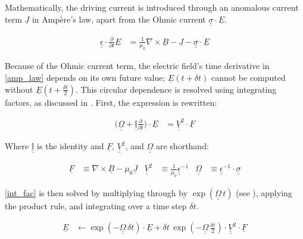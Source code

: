 \documentclass[draft,linenumbers]{agujournal}
\begin{document}

Mathematically, the driving current is introduced through an anomalous current term $\underline{J}$ in Amp\`ere's law, apart from the Ohmic current ${\underline{\underline{\sigma}} \cdot \underline{E}}$.

\begin{linenomath*}
\begin{align}
    \label{amp_law}
    \underline{\underline{\epsilon}} \cdot \frac{\partial}{\partial t} \underline{E} &= \frac{1}{\mu_0} \nabla \times \underline{B} - \underline{J}
      - \underline{\underline{\sigma}} \cdot \underline{E}
\end{align}
\end{linenomath*}

Because of the Ohmic current term, the electric field's time derivative in \cref{amp_law} depends on its own future value; $\underline{E}(t + \delta \! t)$ cannot be computed without $\underline{E}(t + \tfrac{\delta \! t}{2})$. This circular dependence is resolved using integrating factors, as discussed in \citet{lysak_2013}. First, the expression is rewritten:
\begin{linenomath*}
\begin{align}
    \label{int_fac}
    \Big( \underline{\underline{\Omega}} + \underline{\underline{ \mathbb{I} }}\frac{\partial}{\partial t} \Big) \cdot
        \underline{E} &= \underline{\underline{V}}^2 \cdot \underline{F}
\end{align}
\end{linenomath*}

Where $\underline{\underline{ \mathbb{I} }}$ is the identity and $\underline{F}$, $\underline{\underline{V}}^2$, and $\underline{\underline{\Omega}}$ are shorthand:
\begin{linenomath*}
\begin{align}
    \underline{F} &\equiv \nabla \times \underline{B} - \mu_0 \underline{J} &
    \underline{\underline{V}}^2 &\equiv \frac{1}{\mu_0} \underline{\underline{\epsilon}}^{-1} &
    \underline{\underline{\Omega}} &\equiv \underline{\underline{\epsilon}}^{-1} \cdot \underline{\underline{\sigma}}
\end{align}
\end{linenomath*}

\cref{int_fac} is then solved by multiplying through by $\exp \left( \underline{\underline{\Omega}} \, t \right)$ (see \citet{hall_2015}), applying the product rule, and integrating over a time step $\delta \! t$.
\begin{linenomath*}
\begin{align}
    \label{amp_final}
    \underline{E} &\leftarrow \exp \left( -\underline{\underline{\Omega}} \, \delta \! t \right) \cdot \underline{E} +
        \delta \! t \, \exp \left( -\underline{\underline{\Omega}} \, \tfrac{\delta \! t}{2} \right) \cdot
        \underline{\underline{V}}^2 \cdot \underline{F}
\end{align}
\end{linenomath*}
\end{document}
